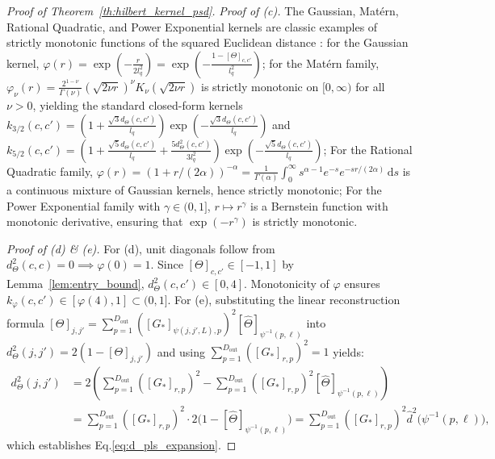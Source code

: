 \documentclass[default,sn-mathphys,Numbered]{sn-jnl}
\theoremstyle{thmstyleone}
\theoremstyle{thmstylethree}
\theoremstyle{thmstyletwo}
\newcommand{\outp}{\text{out}}
\newcommand{\eqnref}[1]{\eqref{#1}}
\begin{document}
\begin{appendices}
\begin{proof}[Proof of Theorem~\ref{th:hilbert_kernel_psd}]
\textit{Proof of (c).} The Gaussian, Mat\'ern, Rational Quadratic, and Power Exponential kernels are classic examples of strictly  monotonic functions of the squared Euclidean distance \citep{williams2006gaussian,schoenberg1938metric,micchelli1986interpolation}:
for the Gaussian kernel, $\varphi(r) = \exp\left(-\frac{r}{2 l_q^2}\right) = \exp\left(-\frac{1 - [\Theta]_{c, c'}}{l_q^2}\right)$;
for the Mat\'ern family, $\varphi_\nu(r) = \frac{2^{1-\nu}}{\Gamma(\nu)} (\sqrt{2\nu r})^\nu K_\nu(\sqrt{2\nu r})$ is strictly  monotonic on $[0, \infty)$ for all $\nu > 0$, yielding the standard closed-form kernels $k_{3/2}(c, c') = \left( 1 + \frac{\sqrt{3} d_\Theta(c, c')}{l_q} \right) \exp\left( - \frac{\sqrt{3} d_\Theta(c, c')}{l_q} \right)$ and $k_{5/2}(c, c') = \left( 1 + \frac{\sqrt{5} d_\Theta(c, c')}{l_q} + \frac{5 d_\Theta^2(c, c')}{3 l_q^2} \right) \exp\left( - \frac{\sqrt{5} d_\Theta(c, c')}{l_q} \right)$;
For the Rational Quadratic family, $\varphi(r) = (1 + r / (2\alpha))^{-\alpha} = \frac{1}{\Gamma(\alpha)} \int_0^\infty s^{\alpha - 1} e^{-s} e^{-s r / (2\alpha)} \, \mathrm{d}s$ is a continuous mixture of Gaussian kernels, hence strictly  monotonic;
For the Power Exponential family with $\gamma \in (0, 1]$, $r \mapsto r^\gamma$ is a Bernstein function with  monotonic derivative, ensuring that $\exp(-r^\gamma)$ is strictly  monotonic.

\textit{Proof of (d) \& (e).}
For (d), unit diagonals follow from $d_\Theta^2(c, c) = 0 \implies \varphi(0) = 1$. Since $[\Theta]_{c, c'} \in [-1, 1]$ by Lemma~\ref{lem:entry_bound}, $d_\Theta^2(c, c') \in [0, 4]$. Monotonicity of $\varphi$ ensures $k_\varphi(c, c') \in [\varphi(4), 1] \subset (0, 1]$.
For (e), substituting the linear reconstruction formula $[\Theta]_{j, j'} = \sum_{p=1}^{D_{\outp}} ([G_*]_{\psi(j, j', L), p})^2 [\hat{\Theta}]_{\psi^{-1}(p, \ell)}$ into $d_\Theta^2(j, j') = 2(1 - [\Theta]_{j, j'})$ and using $\sum_{p=1}^{D_{\outp}} ([G_*]_{r, p})^2 = 1$ yields:
\begin{align}
d_\Theta^2(j, j') &= 2 \left( \sum_{p=1}^{D_{\outp}} ([G_*]_{r, p})^2 - \sum_{p=1}^{D_{\outp}} ([G_*]_{r, p})^2 [\hat{\Theta}]_{\psi^{-1}(p, \ell)} \right) \nonumber \\
&= \sum_{p=1}^{D_{\outp}} ([G_*]_{r, p})^2 \cdot 2\bigl(1 - [\hat{\Theta}]_{\psi^{-1}(p, \ell)}\bigr) = \sum_{p=1}^{D_{\outp}} ([G_*]_{r, p})^2 \hat{d}^2\bigl(\psi^{-1}(p, \ell)\bigr),
\end{align}
which establishes Eq.\eqnref{eq:d_pls_expansion}.
\end{proof}


\end{appendices}
\end{document}
